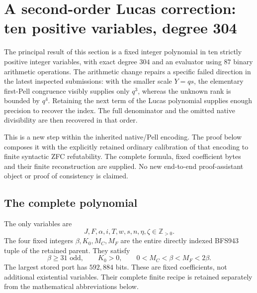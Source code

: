 \section{A second-order Lucas correction: ten positive variables, degree 304}
\label{sec:lucas-q1}

The principal result of this section is a fixed integer polynomial in ten
strictly positive integer variables, with exact degree $304$ and an evaluator
using $87$ binary arithmetic operations.  The arithmetic change repairs a
specific failed direction in the latest inspected submissions: with the
smaller scale $Y=qs$, the elementary first-Pell congruence visibly supplies
only $q^3$, whereas the unknown rank is bounded by $q^4$.  Retaining the next
term of the Lucas polynomial supplies enough precision to recover the index.
The full denominator and the omitted native divisibility are then recovered
in that order.

This is a new step within the inherited native/Pell encoding.  The proof
below composes it with the explicitly retained ordinary calibration of that
encoding to finite syntactic ZFC refutability.  The complete formula, fixed
coefficient bytes and their finite reconstruction are supplied.  No new
end-to-end proof-assistant object or proof of consistency is claimed.

\subsection{The complete polynomial}

The only variables are
\[
 J,F,\alpha,i,T,w,s,n,\eta,\zeta\in\mathbb Z_{>0}.
\]
The four fixed integers $\beta,K_0,M_C,M_F$ are the entire directly indexed
BFS943 tuple of the retained parent.  They satisfy
\[
 \beta\ge31\text{ odd},\qquad K_0>0,\qquad
 0<M_C<\beta<M_F<2\beta.
\]
The largest stored port has $592{,}884$ bits.  These are fixed coefficients,
not additional existential variables.  Their complete finite recipe is
retained separately from the mathematical abbreviations below.

